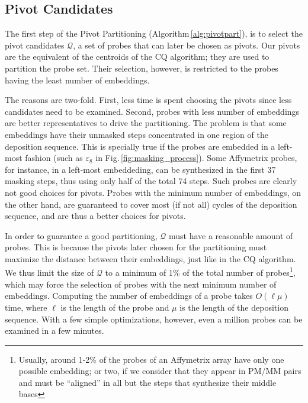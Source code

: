 \documentclass[runningheads]{llncs}
\begin{document}
\subsection{Pivot Candidates}

The first step of the Pivot Partitioning (Algorithm\,\ref{alg:pivotpart}), is to
select the pivot candidates $\mathcal{Q}$, a set of probes that can later be
chosen as pivots. Our pivots are the equivalent of the centroids of the CQ
algorithm; they are used to partition the probe set. Their
selection, however, is restricted to the probes having the least number of
embeddings.

The reasons are two-fold. First, less time is spent choosing the pivots
since less candidates need to be examined.
Second, probes with less number of embeddings are better representatives to drive
the partitioning. The problem is that some embeddings have their unmasked steps
concentrated in one region of the deposition sequence. This is specially true if
the probes are embedded in a left-most fashion (such as $\varepsilon_8$ in
Fig.\,\ref{fig:masking_process}). Some Affymetrix probes, for instance, in a
left-most embeddeding, can be synthesized in the first 37 masking steps, thus
using only half of the total 74 steps. Such probes are clearly not good choices
for pivots. Probes with the minimum number of embeddings, on the other hand,
are guaranteed to cover most (if not all) cycles of the deposition sequence,
and are thus a better choices for pivots.

In order to guarantee a good partitioning, $\mathcal{Q}$ must have a reasonable
amount of probes. This is because the pivots later chosen for the partitioning
must maximize the distance between their embeddings, just like in the CQ
algorithm. We thus limit the size of $\mathcal{Q}$ to a minimum of 1\% of the total
number of probes\footnote{Usually, around 1-2\% of the probes of an Affymetrix array
have only one possible embedding; or two, if we consider that they appear in PM/MM
pairs and must be ``aligned'' in all but the steps that synthesize their middle
bases}, which may force the selection of probes with the next minimum
number of embeddings.
Computing the number of embeddings of a probe takes $O(\ell \mu)$ time, where
$\ell$ is the length of the probe and $\mu$ is the length of the deposition sequence.
With a few simple optimizations, however, even a million probes can be examined in
a few minutes.

\end{document}
